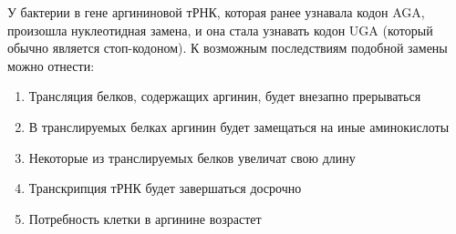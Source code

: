 
У бактерии в гене аргининовой тРНК, которая
ранее узнавала кодон AGA, произошла нуклеотидная замена, и она стала узнавать
кодон UGA (который обычно является стоп-кодоном). К возможным последствиям
подобной замены можно отнести:

\begin{enumerate}
    \item Трансляция белков, содержащих аргинин, будет внезапно прерываться 
    \item В транслируемых белках аргинин будет замещаться на иные аминокислоты 
    \item Некоторые из транслируемых белков увеличат свою длину
    \item Транскрипция тРНК будет завершаться досрочно
    \item Потребность клетки в аргинине возрастет
\end{enumerate}



